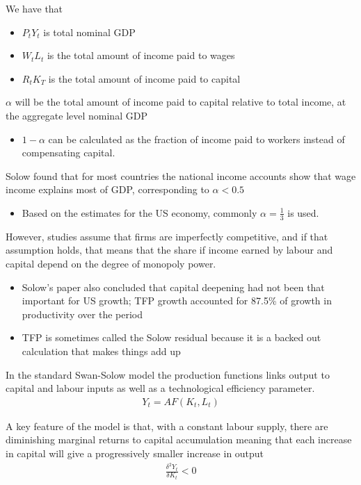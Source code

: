 \documentclass{beamer}
\begin{document}
\begin{frame}
We have that 
\begin{itemize}
  \item $P_t Y_t$ is total nominal GDP
  \item $W_t L_t$ is the total amount of income paid to wages
  \item $R_t K_T$ is the total amount of income paid to capital
\end{itemize}

$\alpha$ will be the total amount of income paid to capital relative to total income, at the aggregate level nominal GDP
\begin{itemize}
  \item $1-\alpha$ can be calculated as the fraction of income paid to workers instead of compensating capital.
\end{itemize}
\end{frame}

\begin{frame}
Solow found that for most countries the national income accounts show that wage income explains most of GDP, corresponding to $\alpha<0.5$
  \begin{itemize}
    \item Based on the estimates for the US economy, commonly $\alpha=\frac{1}{3}$ is used. 
  \end{itemize}
  \medskip
  However, studies assume that firms are imperfectly competitive, and if that assumption holds, that means that the share if income earned by labour and capital depend on the degree of monopoly power. 
  \begin{itemize}
    \item Solow's paper also concluded that capital deepening had not been that important for US growth; TFP growth accounted for 87.5\% of growth in productivity over the period
    \item TFP is sometimes called the Solow residual because it is a backed out calculation that makes things add up
  \end{itemize}
\end{frame}

\begin{frame}
In the standard Swan-Solow model the production functions links output to capital and labour inputs as well as a technological efficiency parameter.
\begin{align}
  Y_t = AF(K_t,L_t) 
\end{align}

A key feature of the model is that, with a constant labour supply, there are diminishing marginal returns to capital accumulation meaning that each increase in capital will give a progressively smaller increase in output
\begin{align}
  \frac{\delta^2Y_t}{\delta K_t}<0
\end{align}
\end{frame}
\end{document}

